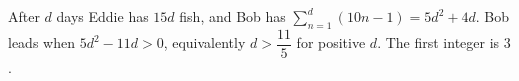 After $d$ days Eddie has $15d$ fish, and Bob has $\sum_{n=1}^d(10n-1)=5d^2+4d$. Bob leads when $5d^2-11d>0$, equivalently $d>\dfrac{11}{5}$ for positive $d$. The first integer is $\boxed3$.
